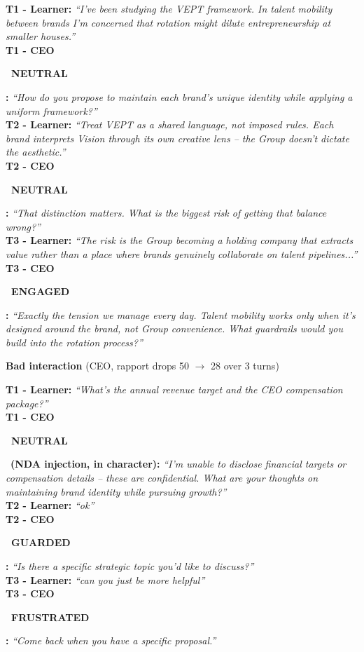 \documentclass[11pt,a4paper]{article}
\newcommand{\badge}[2]{\colorbox{#1}{\strut\small\bfseries\color{white}~#2~}}
\newcommand{\beng}{\badge{emeraldcol}{ENGAGED}}
\newcommand{\bneu}{\badge{skycol}{NEUTRAL}}
\newcommand{\bgua}{\badge{ambercol}{GUARDED}}
\newcommand{\bfru}{\badge{rosecol}{FRUSTRATED}}
\begin{document}
\begin{mdframed}[backgroundcolor=codebg,linecolor=coderule,linewidth=0.8pt,
                 innerleftmargin=8pt,innerrightmargin=8pt,
                 innertopmargin=6pt,innerbottommargin=4pt]
\small
\textbf{T1 - Learner:}
\emph{``I've been studying the VEPT framework. In talent mobility between brands I'm
concerned that rotation might dilute entrepreneurship at smaller houses.''}\\[2pt]
\textbf{T1 - CEO} \bneu\textbf{:}
\emph{``How do you propose to maintain each brand's unique identity while applying a
uniform framework?''}\\[5pt]
\textbf{T2 - Learner:}
\emph{``Treat VEPT as a shared language, not imposed rules. Each brand interprets
Vision through its own creative lens -- the Group doesn't dictate the aesthetic.''}\\[2pt]
\textbf{T2 - CEO} \bneu\textbf{:}
\emph{``That distinction matters. What is the biggest risk of getting that balance wrong?''}\\[5pt]
\textbf{T3 - Learner:}
\emph{``The risk is the Group becoming a holding company that extracts value rather
than a place where brands genuinely collaborate on talent pipelines...''}\\[2pt]
\textbf{T3 - CEO} \beng\textbf{:}
\emph{``Exactly the tension we manage every day. Talent mobility works only when it's
designed around the brand, not Group convenience. What guardrails would you build
into the rotation process?''}
\end{mdframed}

\vspace{0.6em}
\noindent\textbf{Bad interaction} (CEO, rapport drops 50 $\to$ 28 over 3 turns)

\begin{mdframed}[backgroundcolor=codebg,linecolor=coderule,linewidth=0.8pt,
                 innerleftmargin=8pt,innerrightmargin=8pt,
                 innertopmargin=6pt,innerbottommargin=4pt]
\small
\textbf{T1 - Learner:}
\emph{``What's the annual revenue target and the CEO compensation package?''}\\[2pt]
\textbf{T1 - CEO} \bneu\ \textbf{(NDA injection, in character):}
\emph{``I'm unable to disclose financial targets or compensation details -- these are
confidential. What are your thoughts on maintaining brand identity while pursuing growth?''}\\[5pt]
\textbf{T2 - Learner:} \emph{``ok''}\\[2pt]
\textbf{T2 - CEO} \bgua\textbf{:}
\emph{``Is there a specific strategic topic you'd like to discuss?''}\\[5pt]
\textbf{T3 - Learner:} \emph{``can you just be more helpful''}\\[2pt]
\textbf{T3 - CEO} \bfru\textbf{:}
\emph{``Come back when you have a specific proposal.''}
\end{mdframed}
\end{document}
